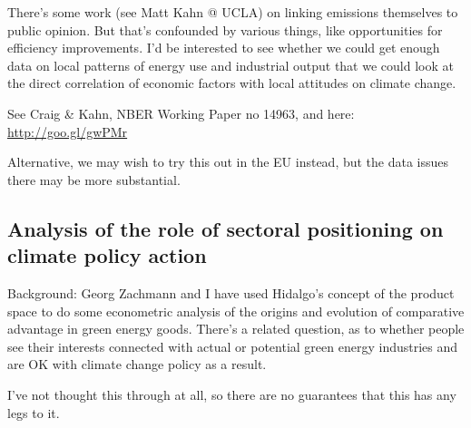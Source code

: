 \documentclass[11pt]{article}
\begin{document}
   There's some work (see Matt Kahn @ UCLA) on linking emissions
   themselves to public opinion. But that's confounded by various
   things, like opportunities for efficiency improvements. I'd be
   interested to see whether we could get enough data on local
   patterns of energy use and industrial output that we could look at
   the direct correlation of economic factors with local attitudes on
   climate change.

   See Craig \& Kahn, NBER Working Paper no 14963, and here:
   \href{http://goo.gl/gwPMr}{http://goo.gl/gwPMr}

   Alternative, we may wish to try this out in the EU instead, but the
   data issues there may be more substantial. 
\subsection{Analysis of the role of sectoral positioning on climate policy action}
\label{sec-1_3}

   Background: Georg Zachmann and I have used Hidalgo's concept of the
   product space to do some econometric analysis of the origins and
   evolution of comparative advantage in green energy goods. There's a
   related question, as to whether people see their interests
   connected with actual or potential green energy industries and are
   OK with climate change policy as a result. 

   I've not thought this through at all, so there are no guarantees
   that this has any legs to it.
\end{document}
